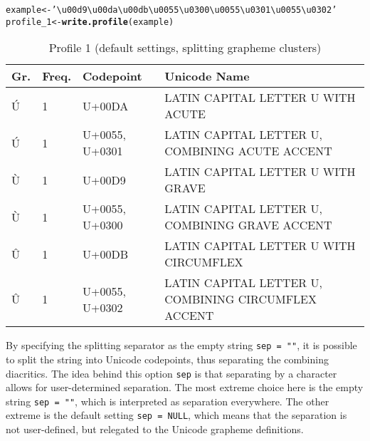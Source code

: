 \documentclass[output=inprep,
		biblatex
		]{LSP/langsci}\usepackage[]{graphicx}\usepackage[]{color}
\makeatletter
\newcommand{\hlstr}[1]{\textcolor[rgb]{0.192,0.494,0.8}{#1}}%
\newcommand{\hlstd}[1]{\textcolor[rgb]{0.345,0.345,0.345}{#1}}%
\newcommand{\hlkwb}[1]{\textcolor[rgb]{0.69,0.353,0.396}{#1}}%
\newcommand{\hlkwd}[1]{\textcolor[rgb]{0.737,0.353,0.396}{\textbf{#1}}}%
\newenvironment{kframe}{%
 \def\at@end@of@kframe{}%
 \ifinner\ifhmode%
  \def\at@end@of@kframe{\end{minipage}}%
  \begin{minipage}{\columnwidth}%
 \fi\fi%
 \def\FrameCommand##1{\hskip\@totalleftmargin \hskip-\fboxsep
 \colorbox{shadecolor}{##1}\hskip-\fboxsep
     \hskip-\linewidth \hskip-\@totalleftmargin \hskip\columnwidth}%
 \MakeFramed {\advance\hsize-\width
   \@totalleftmargin\z@ \linewidth\hsize
   \@setminipage}}%
 {\par\unskip\endMakeFramed%
 \at@end@of@kframe}
\newenvironment{knitrout}{}{} %
\makeatother
\begin{document}
\begin{knitrout}\footnotesize
{}\color{fgcolor}\begin{kframe}
\begin{alltt}
\hlstd{example} \hlkwb{<-} \hlstr{'\textbackslash{}u00d9\textbackslash{}u00da\textbackslash{}u00db\textbackslash{}u0055\textbackslash{}u0300\textbackslash{}u0055\textbackslash{}u0301\textbackslash{}u0055\textbackslash{}u0302'}
\hlstd{profile_1} \hlkwb{<-} \hlkwd{write.profile}\hlstd{(example)}
\end{alltt}
\end{kframe}
\end{knitrout}

\begin{table}[H]
\centering
\begingroup\scriptsize
\begin{tabular}{llll}
  \toprule
Gr. & Freq. & Codepoint & Unicode Name \\ 
  \midrule
Ú & 1 & U+00DA & LATIN CAPITAL LETTER U WITH ACUTE \\ 
  Ú & 1 & U+0055, U+0301 & LATIN CAPITAL LETTER U, COMBINING ACUTE ACCENT \\ 
  Ù & 1 & U+00D9 & LATIN CAPITAL LETTER U WITH GRAVE \\ 
  Ù & 1 & U+0055, U+0300 & LATIN CAPITAL LETTER U, COMBINING GRAVE ACCENT \\ 
  Û & 1 & U+00DB & LATIN CAPITAL LETTER U WITH CIRCUMFLEX \\ 
  Û & 1 & U+0055, U+0302 & LATIN CAPITAL LETTER U, COMBINING CIRCUMFLEX ACCENT \\ 
   \bottomrule
\end{tabular}
\endgroup
\caption{Profile 1 (default settings, splitting grapheme clusters)} 
\label{tab:profile1}
\end{table}


By specifying the splitting separator as the empty string
\texttt{sep~=~""}, it is possible to split the string into Unicode codepoints,
thus separating the combining diacritics. The idea behind this option
\texttt{sep} is that separating by a character allows for user-determined
separation. The most extreme choice here is the empty string \texttt{sep~=~""},
which is interpreted as separation everywhere. The other extreme is the default
setting \texttt{sep~=~NULL}, which means that the separation is not
user-defined, but relegated to the Unicode grapheme definitions.
\end{document}
